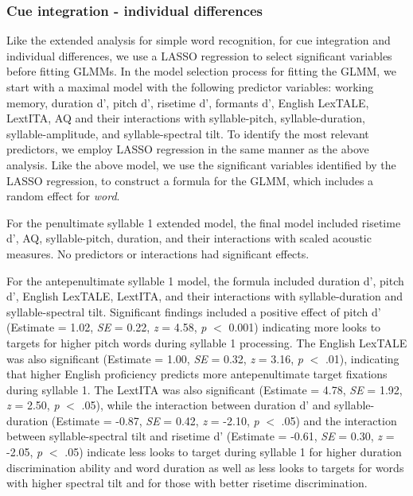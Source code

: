 \subsubsection{Cue integration - individual differences}

Like the extended analysis for simple word recognition, for cue integration and individual differences, we use a LASSO regression to select significant variables before fitting GLMMs. In the model selection process for fitting the GLMM, we start with a maximal model with the following predictor variables: working memory, duration d', pitch d', risetime d', formants d', English LexTALE, LextITA, AQ and their interactions with syllable-pitch, syllable-duration, syllable-amplitude, and syllable-spectral tilt. To identify the most relevant predictors, we employ LASSO regression in the same manner as the above analysis. Like the above model, we use the significant variables identified by the LASSO regression, to construct a formula for the GLMM, which includes a random effect for \textit{word}. 

For the penultimate syllable 1 extended model, the final model included risetime d', AQ, syllable-pitch, duration, and their interactions with scaled acoustic measures. No predictors or interactions had significant effects.

For the antepenultimate syllable 1 model, the formula included duration d', pitch d', English LexTALE, LextITA, and their interactions with syllable-duration and syllable-spectral tilt. Significant findings included a positive effect of pitch d' (Estimate = 1.02, \textit{SE} = 0.22, \textit{z} = 4.58, \textit{p} $<$ 0.001) indicating more looks to targets for higher pitch words during syllable 1 processing. The English LexTALE was also significant (Estimate = 1.00, \textit{SE} = 0.32, \textit{z} = 3.16, \textit{p} $<$ .01), indicating that higher English proficiency predicts more antepenultimate target fixations during syllable 1. The LextITA was also significant (Estimate = 4.78, \textit{SE} = 1.92, \textit{z} = 2.50, \textit{p} $<$ .05), while the interaction between duration d' and syllable-duration (Estimate = -0.87, \textit{SE} = 0.42, \textit{z} = -2.10, \textit{p} $<$ .05) and the interaction between syllable-spectral tilt and risetime d' (Estimate = -0.61, \textit{SE} = 0.30, \textit{z} = -2.05, \textit{p} $<$ .05) indicate less looks to target during syllable 1 for higher duration discrimination ability and word duration as well as less looks to targets for words with higher spectral tilt and for those with better risetime discrimination.

